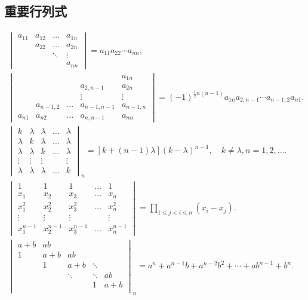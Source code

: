 \subsection*{重要行列式}
\begin{gather*}
	\begin{vmatrix}
		a_{11} & a_{12} & \dots & a_{1n} \\
		& a_{22} & \dots & a_{2n} \\
		& & \ddots & \vdots \\
		& & & a_{nn}
	\end{vmatrix}
	= a_{11} a_{22} \dotsm a_{nn}, \\%
	\begin{vmatrix}
		& & & & a_{1n} \\
		& & & a_{2,n-1} & a_{2n} \\
		& & & \vdots & \vdots \\
		& a_{n-1,2} & \dots & a_{n-1,n-1} & a_{n-1,n} \\
		a_{n1} & a_{n2} & \dots & a_{n,n-1} & a_{nn}
	\end{vmatrix}
	=(-1)^{\frac{1}{2}n(n-1)} a_{1n} a_{2,n-1} \dotsm a_{n-1,2} a_{n1}. \\
	\begin{vmatrix}
		k & \lambda & \lambda & \dots & \lambda \\
		\lambda & k & \lambda & \dots & \lambda \\
		\lambda & \lambda & k & \dots & \lambda \\
		\vdots & \vdots & \vdots & & \vdots \\
		\lambda & \lambda & \lambda & \dots & k
	\end{vmatrix}_n
	= [k+(n-1)\lambda] (k-\lambda)^{n-1},
	\quad k\neq\lambda,n=1,2,\dotsc. \\
	\begin{vmatrix}
		1 & 1 & 1 & \dots & 1 \\
		x_1 & x_2 & x_3 & \dots & x_n \\
		x_1^2 & x_2^2 & x_3^2 & \dots & x_n^2 \\
		\vdots & \vdots & \vdots& & \vdots \\
		x_1^{n-1} & x_2^{n-1} & x_3^{n-1} & \dots & x_n^{n-1}
	\end{vmatrix}
	= \prod_{1 \leq j < i \leq n}(x_i-x_j). \\
	\begin{vmatrix}
		a+b & ab & \\
		1 & a+b & ab & \\
		& 1 & a + b & \ddots & \\
		& & \ddots & \ddots & ab \\
		& & & 1 & a+b \\
	\end{vmatrix}_n
	= a^n + a^{n-1} b + a^{n-2} b^2 + \dotsb + a b^{n-1} + b^n.
\end{gather*}
